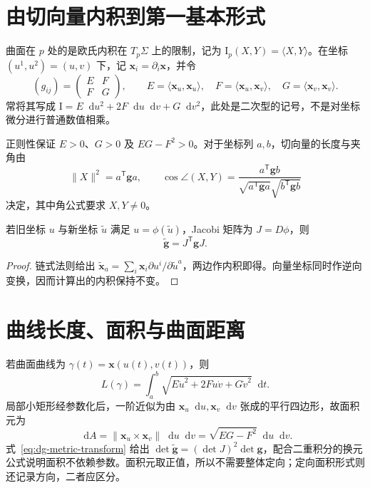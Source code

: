 \documentclass[UTF8,12pt,a4paper,fontset=fandol]{ctexbook}
\newcommand{\dd}{\mathop{}\!\mathrm d}
\newcommand{\ip}[2]{\langle #1,#2\rangle}
\newcommand{\norm}[1]{\lVert #1\rVert}
\begin{document}
\section{由切向量内积到第一基本形式}
\begin{definition}[第一基本形式]
曲面在 $p$ 处的是欧氏内积在 $T_p\Sigma$ 上的限制，记为 $\mathrm I_p(X,Y)=\ip XY$。在坐标 $(u^1,u^2)=(u,v)$ 下，记 $\mathbf x_i=\partial_i\mathbf x$，并令
\[
 (g_{ij})=\begin{pmatrix}E&F\\F&G\end{pmatrix},\qquad
 E=\ip{\mathbf x_u}{\mathbf x_u},\quad
 F=\ip{\mathbf x_u}{\mathbf x_v},\quad
 G=\ip{\mathbf x_v}{\mathbf x_v}.
\]
常将其写成 $\mathrm I=E\dd u^2+2F\dd u\dd v+G\dd v^2$，此处是二次型的记号，不是对坐标微分进行普通数值相乘。
\end{definition}
正则性保证 $E>0$、$G>0$ 及 $EG-F^2>0$。对于坐标列 $a,b$，切向量的长度与夹角由
\[
 \norm X^2=a^{\mathsf T}\mathbf g a,\qquad
 \cos\angle(X,Y)=\frac{a^{\mathsf T}\mathbf g b}
 {\sqrt{a^{\mathsf T}\mathbf g a}\sqrt{b^{\mathsf T}\mathbf g b}}
\]
决定，其中角公式要求 $X,Y\ne0$。

\begin{proposition}[度量变换律]
若旧坐标 $u$ 与新坐标 $\widetilde u$ 满足 $u=\phi(\widetilde u)$，Jacobi 矩阵为 $J=D\phi$，则
\begin{equation}
 \widetilde{\mathbf g}=J^{\mathsf T}\mathbf gJ.
 \label{eq:dg-metric-transform}
\end{equation}
\end{proposition}
\begin{proof}
链式法则给出 $\widetilde{\mathbf x}_a=\sum_i\mathbf x_i\partial u^i/\partial\widetilde u^a$，两边作内积即得。向量坐标同时作逆向变换，因而计算出的内积保持不变。
\end{proof}

\section{曲线长度、面积与曲面距离}
若曲面曲线为 $\gamma(t)=\mathbf x(u(t),v(t))$，则
\begin{equation}
 L(\gamma)=\int_a^b\sqrt{E\dot u^2+2F\dot u\dot v+G\dot v^2}\dd t.
 \label{eq:dg-surface-length}
\end{equation}
局部小矩形经参数化后，一阶近似为由 $\mathbf x_u\dd u,\mathbf x_v\dd v$ 张成的平行四边形，故面积元为
\begin{equation}
 \dd A=\norm{\mathbf x_u\times\mathbf x_v}\dd u\dd v
       =\sqrt{EG-F^2}\dd u\dd v.
 \label{eq:dg-area}
\end{equation}
式~\eqref{eq:dg-metric-transform} 给出 $\det\widetilde{\mathbf g}=(\det J)^2\det\mathbf g$，配合二重积分的换元公式说明面积不依赖参数。面积元取正值，所以不需要整体定向；定向面积形式则还记录方向，二者应区分。
\end{document}
